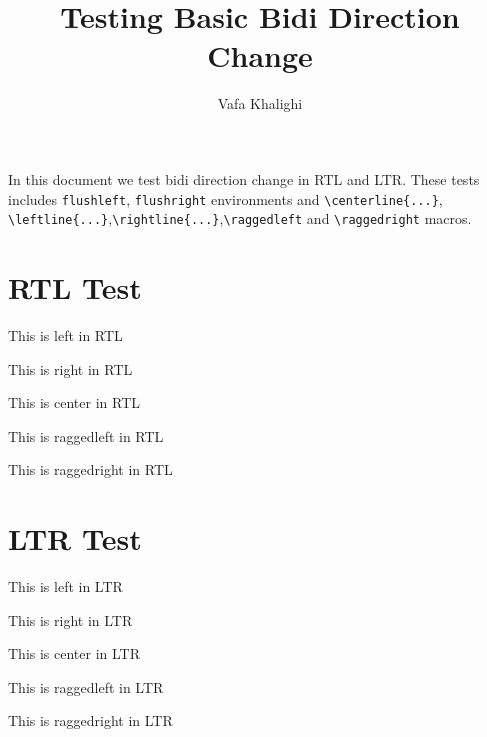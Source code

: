 \documentclass{article}
\title{Testing Basic Bidi Direction Change}
\author{Vafa Khalighi}
\begin{document}
\maketitle
In this document we test bidi direction change in \textsf{RTL} and \textsf{LTR}. These tests includes \texttt{flushleft}, \texttt{flushright} environments and \verb|\centerline{...}|, \verb|\leftline{...}|,\verb|\rightline{...}|,\verb|\raggedleft| and \verb|\raggedright| macros.
\section{RTL Test}
\setRTL
\begin{flushleft}
This is left in RTL
\end{flushleft}
\begin{flushright}
This is right in RTL
\end{flushright}
\centerline{This is center in RTL}



\raggedleft This is raggedleft in RTL

\raggedright This is raggedright in RTL

\setLTR
\section{LTR Test}
\begin{flushleft}
This is left in LTR
\end{flushleft}
\begin{flushright}
This is right in LTR
\end{flushright}
\centerline{This is center in LTR}



\raggedleft This is raggedleft in LTR

\raggedright This is raggedright in LTR
\end{document}
